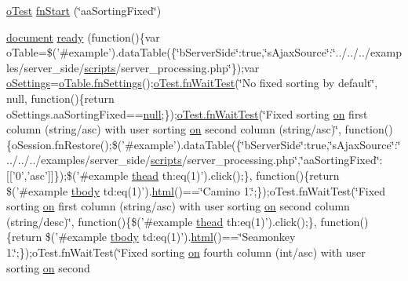 \begin{DoxyCompactItemize}
\item 
\hyperlink{unit__test_8js_a3b2d259e2df3b6860d9047a92d09d0d6}{o\+Test} \hyperlink{4__server-side_2aa_sorting_fixed_8js_a39c08dcfee7d304f849557b416e3e268}{fn\+Start} (\char`\"{}aa\+Sorting\+Fixed\char`\"{})
\item 
\hyperlink{outside_events_8js_aa14f8e0338cced6720590fd2ea13bd4b}{document} \hyperlink{4__server-side_2aa_sorting_fixed_8js_a639c078ce52dd86ed05cb84c02ec3e75}{ready} (function()\{var o\+Table=\$('\#example').data\+Table(\{\char`\"{}b\+Server\+Side\char`\"{}\+:true,\char`\"{}s\+Ajax\+Source\char`\"{}\+:\char`\"{}../../../examples/server\+\_\+side/\hyperlink{tinymce_8jquery_8dev_8js_a09066d4d580eeec222f858d588b4cdef}{scripts}/server\+\_\+processing.\+php\char`\"{}\});var \hyperlink{model_8settings_8js_a4857b9c813b4dea010668e9555d0aca7}{o\+Settings}=\hyperlink{api_8methods_8js_a78f387fab92a85c2cb7830bc5d8a6141}{o\+Table.\+fn\+Settings}();\hyperlink{onhold_24__server-side_2__zero__config_8js_ab25c4d596771c0133cdc45178ce72c3d}{o\+Test.\+fn\+Wait\+Test}(\char`\"{}No fixed sorting by default\char`\"{}, null, function()\{return o\+Settings.\+aa\+Sorting\+Fixed==\hyperlink{validate_8js_afb8e110345c45e74478894341ab6b28e}{null};\});\hyperlink{onhold_24__server-side_2__zero__config_8js_ab25c4d596771c0133cdc45178ce72c3d}{o\+Test.\+fn\+Wait\+Test}(\char`\"{}Fixed sorting \hyperlink{fullpage_2plugin_8min_8js_a1cfa98b7fed2aaf9fee3b68dbb7f9497}{on} first column (string/asc) with user sorting \hyperlink{fullpage_2plugin_8min_8js_a1cfa98b7fed2aaf9fee3b68dbb7f9497}{on} second column (string/asc)\char`\"{}, function()\{o\+Session.\+fn\+Restore();\$('\#example').data\+Table(\{\char`\"{}b\+Server\+Side\char`\"{}\+:true,\char`\"{}s\+Ajax\+Source\char`\"{}\+:\char`\"{}../../../examples/server\+\_\+side/\hyperlink{tinymce_8jquery_8dev_8js_a09066d4d580eeec222f858d588b4cdef}{scripts}/server\+\_\+processing.\+php\char`\"{},\char`\"{}aa\+Sorting\+Fixed\char`\"{}\+:\mbox{[}\mbox{[}'0','asc'\mbox{]}\mbox{]}\});\$('\#example \hyperlink{core_8constructor_8js_a856be760b6816c9591ce69f0a2b43693}{thead} th\+:eq(1)').click();\}, function()\{return \$('\#example \hyperlink{core_8constructor_8js_a99b0542c7c50fe8757c55bf9dac5f3be}{tbody} td\+:eq(1)').\hyperlink{tinymce_8jquery_8dev_8js_ac2090bcf2ff968c0083d5de53a6544f3}{html}()==\char`\"{}Camino 1.\char`\"{};\});o\+Test.\+fn\+Wait\+Test(\char`\"{}Fixed sorting \hyperlink{fullpage_2plugin_8min_8js_a1cfa98b7fed2aaf9fee3b68dbb7f9497}{on} first column (string/asc) with user sorting \hyperlink{fullpage_2plugin_8min_8js_a1cfa98b7fed2aaf9fee3b68dbb7f9497}{on} second column (string/desc)\char`\"{}, function()\{\$('\#example \hyperlink{core_8constructor_8js_a856be760b6816c9591ce69f0a2b43693}{thead} th\+:eq(1)').click();\}, function()\{return \$('\#example \hyperlink{core_8constructor_8js_a99b0542c7c50fe8757c55bf9dac5f3be}{tbody} td\+:eq(1)').\hyperlink{tinymce_8jquery_8dev_8js_ac2090bcf2ff968c0083d5de53a6544f3}{html}()==\char`\"{}Seamonkey 1.\char`\"{};\});o\+Test.\+fn\+Wait\+Test(\char`\"{}Fixed sorting \hyperlink{fullpage_2plugin_8min_8js_a1cfa98b7fed2aaf9fee3b68dbb7f9497}{on} fourth column (int/asc) with user sorting \hyperlink{fullpage_2plugin_8min_8js_a1cfa98b7fed2aaf9fee3b68dbb7f9497}{on} second 
\end{DoxyCompactItemize}

